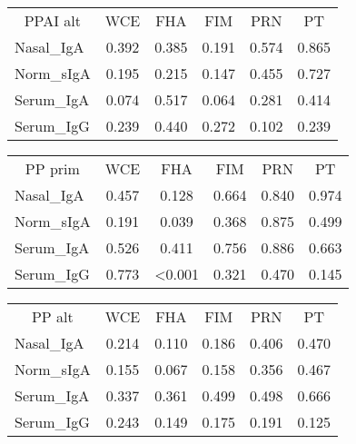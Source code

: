 \documentclass[
]{article}
\begin{document}
\begin{tabular}{>{}l|>{}c|>{}c|>{}c|>{}c|c}
\hline
\multicolumn{1}{c|}{PPAI alt} & \multicolumn{1}{c|}{WCE} & \multicolumn{1}{c|}{FHA} & \multicolumn{1}{c|}{FIM} & \multicolumn{1}{c|}{PRN} & \multicolumn{1}{c}{PT} \\
\cline{1-1} \cline{2-2} \cline{3-3} \cline{4-4} \cline{5-5} \cline{6-6}
Nasal\_IgA & 0.392 & 0.385 & 0.191 & 0.574 & 0.865\\
\hline
Norm\_sIgA & 0.195 & 0.215 & 0.147 & 0.455 & 0.727\\
\hline
Serum\_IgA & 0.074 & 0.517 & 0.064 & 0.281 & 0.414\\
\hline
Serum\_IgG & 0.239 & 0.440 & 0.272 & 0.102 & 0.239\\
\hline
\end{tabular}

\begin{tabular}{>{}l|>{}c|>{}c|>{}c|>{}c|c}
\hline
\multicolumn{1}{c|}{PP prim} & \multicolumn{1}{c|}{WCE} & \multicolumn{1}{c|}{FHA} & \multicolumn{1}{c|}{FIM} & \multicolumn{1}{c|}{PRN} & \multicolumn{1}{c}{PT} \\
\cline{1-1} \cline{2-2} \cline{3-3} \cline{4-4} \cline{5-5} \cline{6-6}
Nasal\_IgA & 0.457 & 0.128 & 0.664 & 0.840 & 0.974\\
\hline
Norm\_sIgA & 0.191 & 0.039 & 0.368 & 0.875 & 0.499\\
\hline
Serum\_IgA & 0.526 & 0.411 & 0.756 & 0.886 & 0.663\\
\hline
Serum\_IgG & 0.773 & <0.001 & 0.321 & 0.470 & 0.145\\
\hline
\end{tabular}

\begin{tabular}{>{}l|>{}c|>{}c|>{}c|>{}c|c}
\hline
\multicolumn{1}{c|}{PP alt} & \multicolumn{1}{c|}{WCE} & \multicolumn{1}{c|}{FHA} & \multicolumn{1}{c|}{FIM} & \multicolumn{1}{c|}{PRN} & \multicolumn{1}{c}{PT} \\
\cline{1-1} \cline{2-2} \cline{3-3} \cline{4-4} \cline{5-5} \cline{6-6}
Nasal\_IgA & 0.214 & 0.110 & 0.186 & 0.406 & 0.470\\
\hline
Norm\_sIgA & 0.155 & 0.067 & 0.158 & 0.356 & 0.467\\
\hline
Serum\_IgA & 0.337 & 0.361 & 0.499 & 0.498 & 0.666\\
\hline
Serum\_IgG & 0.243 & 0.149 & 0.175 & 0.191 & 0.125\\
\hline
\end{tabular}
\end{document}
